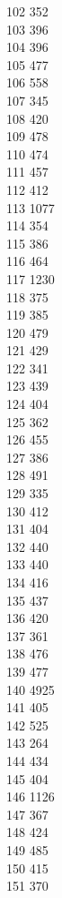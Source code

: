 { 102	352 \\
 103	396 \\
 104	396 \\
 105	477 \\
 106	558 \\
 107	345 \\
 108	420 \\
 109	478 \\
 110	474 \\
 111	457 \\
 112	412 \\
 113	1077 \\
 114	354 \\
 115	386 \\
 116	464 \\
 117	1230 \\
 118	375 \\
 119	385 \\
 120	479 \\
 121	429 \\
 122	341 \\
 123	439 \\
 124	404 \\
 125	362 \\
 126	455 \\
 127	386 \\
 128	491 \\
 129	335 \\
 130	412 \\
 131	404 \\
 132	440 \\
 133	440 \\
 134	416 \\
 135	437 \\
 136	420 \\
 137	361 \\
 138	476 \\
 139	477 \\
 140	4925 \\
 141	405 \\
 142	525 \\
 143	264 \\
 144	434 \\
 145	404 \\
 146	1126 \\
 147	367 \\
 148	424 \\
 149	485 \\
 150	415 \\
 151	370 \\
}
